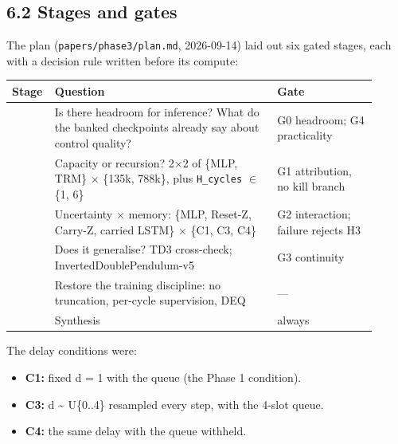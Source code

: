 \documentclass[11pt]{article}
\begin{document}
\subsection*{6.2 Stages and gates}



The plan (\texttt{papers/\allowbreak{}phase3/\allowbreak{}plan.\allowbreak{}md}, 2026-09-14) laid out six gated stages, each with a decision rule written before its compute:



\begin{center}\small\begin{tabular}{>{\raggedright\arraybackslash}p{0.063\linewidth}>{\raggedright\arraybackslash}p{0.581\linewidth}>{\raggedright\arraybackslash}p{0.262\linewidth}}
\toprule
Stage & Question & Gate \\
\midrule
0 & Is there headroom for inference? What do the banked checkpoints already say about control quality? & G0 headroom; G4 practicality \\
1 & Capacity or recursion? 2$\times$2 of \{MLP, TRM\} $\times$ \{135k, 788k\}, plus \texttt{H\_cycles} $\in$ \{1, 6\} & G1 attribution, no kill branch \\
2 & Uncertainty $\times$ memory: \{MLP, Reset-Z, Carry-Z, carried LSTM\} $\times$ \{C1, C3, C4\} & G2 interaction; failure rejects H3 \\
3 & Does it generalise? TD3 cross-check; InvertedDoublePendulum-v5 & G3 continuity \\
4 & Restore the training discipline: no truncation, per-cycle supervision, DEQ & --- \\
5 & Synthesis & always \\
\bottomrule
\end{tabular}\end{center}



The delay conditions were:

\begin{itemize}
\item \textbf{C1:} fixed d = 1 with the queue (the Phase 1 condition).
\item \textbf{C3:} d \textasciitilde{} U\{0..4\} resampled every step, with the 4-slot queue.
\item \textbf{C4:} the same delay with the queue withheld.
\end{itemize}
\end{document}
